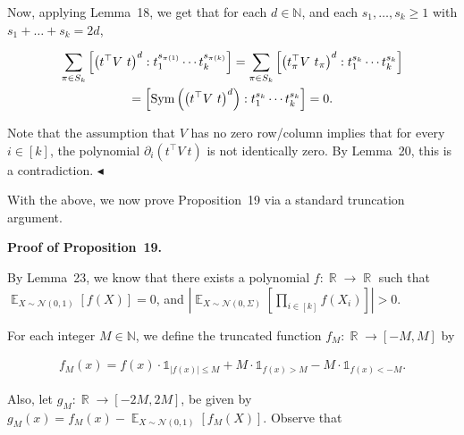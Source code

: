 Now, applying Lemma 18, we get that for each $d\in\mathbb{N}$, and each $s_{1},\dots,s_{k}\geqslant 1$ with $s_{1}+\dots+s_{k}=2d$,\par


\[\begin{gathered}
\displaystyle\sum_{\pi\in S_{k}}\left[\left(t^{\top}V\ t\right)^{d}:t_{1}^{s_{\pi(1)}}\cdots t_{k}^{s_{\pi(k)}}\right] \displaystyle=\sum_{\pi\in S_{k}}\left[\left(t_{\pi}^{\top}V\ t_{\pi}\right)^{d}:t_{1}^{s_{k}}\cdots t_{k}^{s_{k}}\right] \\
\displaystyle=\left[\textnormal{Sym}\left(\left(t^{\top}V\ t\right)^{d}\right):t_{1}^{s_{k}}\cdots t_{k}^{s_{k}}\right]=0.
\end{gathered}\]


Note that the assumption that $V$ has no zero row/column implies that for every $i\in[k]$, the polynomial $\partial_{i}\left(t^{\top}V\ t\right)$ is not identically zero.
By Lemma 20, this is a contradiction.
$\blacktriangleleft$\par




With the above, we now prove Proposition 19 via a standard truncation argument.\par





\par\medskip\noindent\textbf{Proof of Proposition 19.}\par




By Lemma 23, we know that there exists a polynomial $f:\mathop{\mathbb{R}}\to\mathop{\mathbb{R}}$ such that $\mathop{\mathbb{E}}_{X\sim\mathcal{N}(0,1)}\left[f(X)\right]=0$, and $\left|\mathop{\mathbb{E}}_{X\sim\mathcal{N}(0,\Sigma)}\left[\prod_{i\in[k]}f(X_{i})\right]\right|>0$.\par




For each integer $M\in\mathbb{N}$, we define the truncated function $f_{M}:\mathop{\mathbb{R}}\to[-M,M]$ by\par


\[\begin{gathered}
f_{M}(x)=f(x)\cdot\mathds{1}_{\left|f(x)\right|\leqslant M}+M\cdot\mathds{1}_{f(x)>M}-M\cdot\mathds{1}_{f(x)<-M}.
\end{gathered}\]


Also, let $g_{M}:\mathop{\mathbb{R}}\to[-2M,2M]$, be given by $g_{M}(x)=f_{M}(x)-\mathop{\mathbb{E}}_{X\sim\mathcal{N}(0,1)}\left[f_{M}(X)\right]$.
Observe that\par


